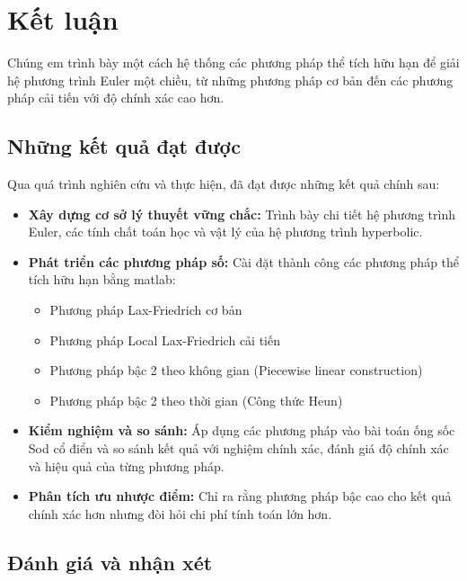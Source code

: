 \section*{Kết luận}

Chúng em trình bày một cách hệ thống các phương pháp thể tích hữu hạn để giải hệ phương trình Euler một chiều, từ những phương pháp cơ bản đến các phương pháp cải tiến với độ chính xác cao hơn.

\subsection{Những kết quả đạt được}

Qua quá trình nghiên cứu và thực hiện, đã đạt được những kết quả chính sau:

\begin{itemize}
    \item \textbf{Xây dựng cơ sở lý thuyết vững chắc:} Trình bày chi tiết hệ phương trình Euler, các tính chất toán học và vật lý của hệ phương trình hyperbolic.
    
    \item \textbf{Phát triển các phương pháp số:} Cài đặt thành công các phương pháp thể tích hữu hạn bằng matlab:
    \begin{itemize}
        \item Phương pháp Lax-Friedrich cơ bản
        \item Phương pháp Local Lax-Friedrich cải tiến
        \item Phương pháp bậc 2 theo không gian (Piecewise linear construction)
        \item Phương pháp bậc 2 theo thời gian (Công thức Heun)
    \end{itemize}
    
    \item \textbf{Kiểm nghiệm và so sánh:} Áp dụng các phương pháp vào bài toán ống sốc Sod cổ điển và so sánh kết quả với nghiệm chính xác, đánh giá độ chính xác và hiệu quả của từng phương pháp.
    
    \item \textbf{Phân tích ưu nhược điểm:} Chỉ ra rằng phương pháp bậc cao cho kết quả chính xác hơn nhưng đòi hỏi chi phí tính toán lớn hơn.
\end{itemize}

\subsection{Đánh giá và nhận xét}


